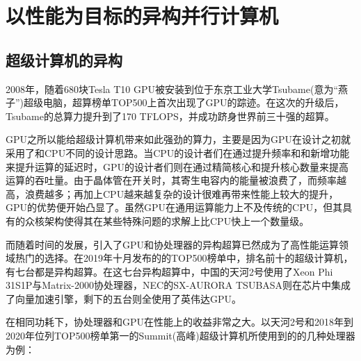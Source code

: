 \documentclass[UTF8,a4paper,10pt]{ctexart}
\begin{document}
\section{以性能为目标的异构并行计算机}
\subsection{超级计算机的异构}
2008年，随着680块Tesla T10 GPU被安装到位于东京工业大学Tsubame(意为“燕子”)超级电脑，超算榜单TOP500上首次出现了GPU的踪迹。在这次的升级后，Tsubame的总算力提升到了170 TFLOPS，并成功跻身世界前三十强的超算。\cite{tsubame_wiki}

GPU之所以能给超级计算机带来如此强劲的算力，主要是因为GPU在设计之初就采用了和CPU不同的设计思路。当CPU的设计者们在通过提升频率和和新增功能来提升运算的延迟时，GPU的设计者们则在通过精简核心和提升核心数量来提高运算的吞吐量。由于晶体管在开关时，其寄生电容内的能量被浪费了，而频率越高，浪费越多；再加上CPU越来越复杂的设计很难再带来性能上较大的提升，GPU的优势便开始凸显了。虽然GPU在通用运算能力上不及传统的CPU，但其具有的众核架构使得其在某些特殊问题的求解上比CPU快上一个数量级。

而随着时间的发展，引入了GPU和协处理器的异构超算已然成为了高性能运算领域热门的选择。在2019年十月发布的的TOP500榜单中，排名前十的超级计算机，有七台都是异构超算。在这七台异构超算中，中国的天河2号使用了Xeon Phi 31S1P与Matrix-2000协处理器，NEC的SX-AURORA TSUBASA则在芯片中集成了向量加速引擎，剩下的五台则全使用了英伟达GPU。\cite{supercom_gpu}

在相同功耗下，协处理器和GPU在性能上的收益非常之大。以天河2号和2018年到2020年位列TOP500榜单第一的Summit(高峰)超级计算机所使用到的的几种处理器为例：

\end{document}
